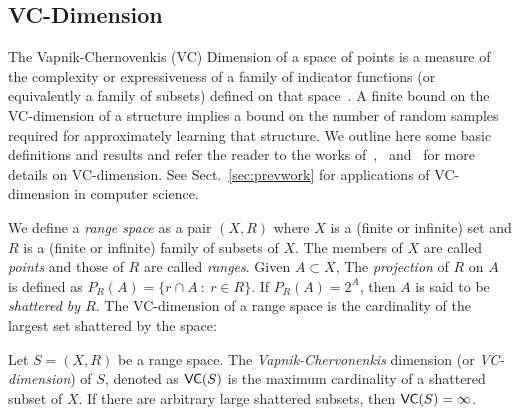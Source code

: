 \subsection{VC-Dimension}\label{sec:prelvcdim}
The Vapnik-Chernovenkis (VC) Dimension of a space of points is a measure of the
complexity or expressiveness of a family of indicator functions (or equivalently
a family of subsets) defined on that space~\cite{VapnikC71}. A finite bound on
the VC-dimension of a structure implies a bound on the number of random samples
required for approximately learning that structure. We outline here some basic
definitions and results and refer the reader to the works
of~\citet[Sect.~14.4]{AlonS08},~\citet{MohriRT12} and~\citet{Vapnik99} for more details
on VC-dimension. See Sect.~\ref{sec:prevwork} for applications of VC-dimension in 
computer science.

%
We define a {\em range space} as a pair $(X,R)$ where $X$ is a (finite or infinite) set
 and $R$ is a (finite or infinite) family of subsets of $X$. The members of $X$
 are called {\em points} and those of $R$ are called {\em ranges}.
Given $A\subset X$, The {\em projection} of $R$ on
$A$ is defined as $P_R(A)=\{r\cap A ~:~ r\in R\}$.
%
If $P_R(A)=2^A$, then $A$ is said to be {\em shattered by $R$}.
The VC-dimension of a range space is the cardinality of the largest set
shattered by the space:
\begin{definition}\label{defn:VCdim}
  Let $S=(X,R)$ be a range space. The {\em Vapnik-Chervonenkis} dimension (or
  {\em VC-dimension}) of $S$, denoted as $\mathsf{VC}(S)$ is the maximum cardinality of
  a shattered subset of $X$. If there are arbitrary large shattered subsets,
  then $\mathsf{VC}(S)=\infty$.
\end{definition}

